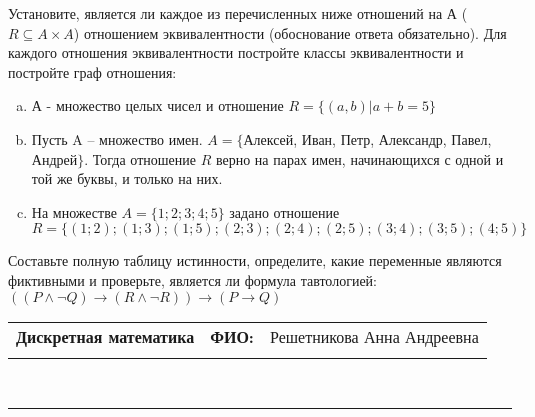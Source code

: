 \documentclass[10pt]{exam}
\newcommand{\class}{Дискретная математика}
\newcommand{\examdate}{}
\begin{document}
\begin{questions}
\question
Установите, является ли каждое из перечисленных ниже отношений на А ($R \subseteq A \times A$) отношением эквивалентности (обоснование ответа обязательно). Для каждого отношения эквивалентности постройте классы 
эквивалентности и постройте граф отношения:
\begin{enumerate} [a)]\setcounter{enumi}{0}
\item А - множество целых чисел и отношение $R = \{(a,b)|a + b = 5\}$
\item Пусть A – множество имен. $A = \{ $Алексей, Иван, Петр, Александр, Павел, Андрей$ \}$. Тогда отношение $R $ верно на парах имен, начинающихся с одной и той же буквы, и только на них.
\item На множестве $A = \{1; 2; 3; 4; 5\}$ задано отношение $R = \{(1; 2); (1; 3); (1; 5); (2; 3); (2; 4); (2; 5); (3; 4); (3; 5); (4; 5)\}$
\end{enumerate}\question Составьте полную таблицу истинности, определите, какие переменные являются фиктивными и проверьте, является ли формула тавтологией:
$(( P \land \neg Q) \rightarrow (R \land \neg R)) \rightarrow (P \rightarrow Q)$

\end{questions}
\newpage
\begin{flushright}
\begin{tabular}{p{2.8in} r l}
\textbf{\class} & \textbf{ФИО:} &Решетникова Анна Андреевна
\\

\textbf{\examdate} &&\\
\end{tabular}\\
\end{flushright}
\rule[1ex]{\textwidth}{.1pt}
\end{document}
